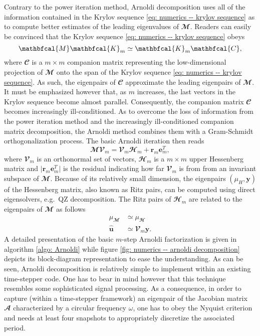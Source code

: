    Contrary to the power iteration method, Arnoldi decomposition uses all of the information contained in the Krylov sequence \eqref{eq: numerics -- krylov sequence} as to compute better estimates of the leading eigenvalues of $\mathbfcal{M}$. Readers can easily be convinced that the Krylov sequence \eqref{eq: numerics -- krylov sequence} obeys
    \begin{equation}
      \mathbfcal{M} \mathbfcal{K}_m \simeq \mathbfcal{K}_m \mathbfcal{C},
      \notag
    \end{equation}
    where $\mathbfcal{C}$ is a $m \times m$ companion matrix representing the low-dimensional projection of $\mathbfcal{M}$ onto the span of the Krylov sequence \eqref{eq: numerics -- krylov sequence}. As such, the eigenpairs of $\mathbfcal{C}$ approximate the leading eigenpairs of $\mathbfcal{M}$. It must be emphasized however that, as $m$ increases, the last vectors in the Krylov sequence become almost parallel. Consequently, the companion matrix $\mathbfcal{C}$ becomes increasingly ill-conditioned. As to overcome the loss of information from the power iteration method and the increasingly ill-conditioned companion matrix decomposition, the Arnoldi method combines them with a Gram-Schmidt orthogonalization process. The basic Arnoldi iteration then reads
    \begin{equation}
      \mathbfcal{MV}_m = \mathbfcal{V}_m \mathbfcal{H}_m + \mathbf{r}_{m} \mathbf{e}^T_m,
      \label{eq: numerics -- m-step Arnoldi}
    \end{equation}
    where $\mathbfcal{V}_m$ is an orthonormal set of vectors, $\mathbfcal{H}_m$ is a $m \times m$ upper Hessenberg matrix and $\vert \mathbf{r}_{m} \mathbf{e}^T_m \vert$ is the residual indicating how far $\mathbfcal{V}_m$ is from from an invariant subspace of $\mathbfcal{M}$. Because of its relatively small dimension, the eigenpairs $\left( \mu_H, \mathbf{y} \right)$ of the Hessenberg matrix, also known as Ritz pairs, can be computed using direct eigensolvers, e.g.\ QZ decomposition. The Ritz pairs of $\mathbfcal{H}_m$ are related to the eigenpairs of $\mathbfcal{M}$ as follows
    \begin{equation}
      \begin{aligned}
        \mu_{\mathbfcal{M}} & \simeq \mu_{\mathbfcal{H}} \\
        \hat{\mathbf{u}} & \simeq \mathbfcal{V}_m \mathbf{y}.
      \end{aligned}
    \end{equation}
    A detailed presentation of the basic $m$-step Arnoldi factorization is given in algorithm \eqref{algo: Arnoldi} while figure \ref{fig: numerics -- arnoldi decomposition} depicts its block-diagram representation to ease the understanding. As can be seen, Arnoldi decomposition is relatively simple to implement within an existing time-stepper code. One has to bear in mind however that this technique resembles some sophisticated signal processing. As a consequence, in order to capture (within a time-stepper framework) an eigenpair of the Jacobian matrix $\mathbfcal{A}$ characterized by a circular frequency $\omega$, one has to obey the Nyquist criterion and needs at least four snapshots to appropriately discretize the associated period.

